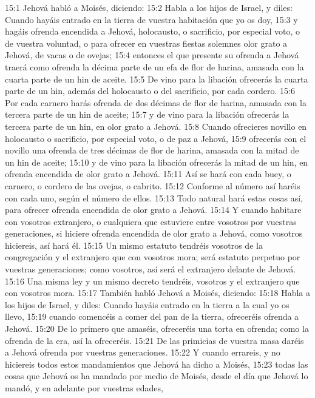 15:1 Jehová habló a Moisés, diciendo:  
15:2 Habla a los hijos de Israel, y diles: Cuando hayáis entrado en la tierra de vuestra habitación que yo os doy,  
15:3 y hagáis ofrenda encendida a Jehová, holocausto, o sacrificio, por especial voto, o de vuestra voluntad, o para ofrecer en vuestras fiestas solemnes olor grato a Jehová, de vacas o de ovejas;  
15:4 entonces el que presente su ofrenda a Jehová traerá como ofrenda la décima parte de un efa   de flor de harina, amasada con la cuarta parte de un hin de aceite.  
15:5 De vino para la libación ofrecerás la cuarta parte de un hin, además del holocausto o del sacrificio, por cada cordero.  
15:6 Por cada carnero harás ofrenda de dos décimas de flor de harina, amasada con la tercera parte de un hin   de aceite;  
15:7 y de vino para la libación ofrecerás la tercera parte de un hin,  en olor grato a Jehová.  
15:8 Cuando ofrecieres novillo en holocausto o sacrificio, por especial voto, o de paz a Jehová,  
15:9 ofrecerás con el novillo una ofrenda de tres décimas de flor de harina, amasada con la mitad de un hin   de aceite;  
15:10 y de vino para la libación ofrecerás la mitad de un hin, en ofrenda encendida de olor grato a Jehová.  
15:11 Así se hará con cada buey, o carnero, o cordero de las ovejas, o cabrito.  
15:12 Conforme al número así haréis con cada uno, según el número de ellos.  
15:13 Todo natural hará estas cosas así, para ofrecer ofrenda encendida de olor grato a Jehová.  
15:14 Y cuando habitare con vosotros extranjero, o cualquiera que estuviere entre vosotros por vuestras generaciones, si hiciere ofrenda encendida de olor grato a Jehová, como vosotros hiciereis, así hará él.  
15:15 Un mismo estatuto tendréis vosotros de la congregación y el extranjero que con vosotros mora; será estatuto perpetuo por vuestras generaciones; como vosotros, así será el extranjero delante de Jehová.  
15:16 Una misma ley y un mismo decreto tendréis, vosotros y el extranjero que con vosotros mora.  
15:17 También habló Jehová a Moisés, diciendo:  
15:18 Habla a los hijos de Israel, y diles: Cuando hayáis entrado en la tierra a la cual yo os llevo,  
15:19 cuando comencéis a comer del pan de la tierra, ofreceréis ofrenda a Jehová.  
15:20 De lo primero que amaséis, ofreceréis una torta en ofrenda; como la ofrenda de la era, así la ofreceréis.  
15:21 De las primicias de vuestra masa daréis a Jehová ofrenda por vuestras generaciones.  
15:22 Y cuando errareis, y no hiciereis todos estos mandamientos que Jehová ha dicho a Moisés,  
15:23 todas las cosas que Jehová os ha mandado por medio de Moisés, desde el día que Jehová lo mandó, y en adelante por vuestras edades,  
